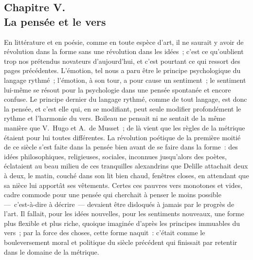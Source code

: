 \documentclass[french,twoside]{book} %
\begin{document}
\subsection[{Chapitre V. La pensée et le vers}]{Chapitre V. \\
La pensée et le vers}
\noindent  En littérature et en poésie, comme en toute espèce d’art, il ne saurait y avoir de révolution dans la forme sans une révolution dans les idées ; c’est ce qu’oublient trop nos prétendus novateurs d’aujourd’hui, et c’est pourtant ce qui ressort des pages précédentes. L’émotion, tel nous a paru être le principe psychologique du langage rythmé ; l’émotion, à son tour, a pour cause un sentiment ; le sentiment lui-même se résout pour la psychologie dans une pensée spontanée et encore confuse. Le principe dernier du langage rythmé, comme de tout langage, est donc la pensée, et c’est elle qui, en se modifiant, peut seule modifier profondément le rythme et l’harmonie du vers. Boileau ne pensait ni ne sentait de la même manière que V. Hugo et A. de Musset ; de là vient que les règles de la métrique étaient pour lui toutes différentes. La révolution poétique de la première moitié de ce siècle s’est faite dans la pensée bien avant de se faire dans la forme : des idées  philosophiques, religieuses, sociales, inconnues jusqu’alors des poètes, éclataient au beau milieu de ces tranquilles alexandrins que Delille attachait deux à deux, le matin, couché dans son lit bien chaud, fenêtres closes, en attendant que sa nièce lui apportât ses vêtements. Certes ces pauvres vers monotones et vides, cadre commode pour une pensée qui cherchait à penser le moins possible — c’est-à-dire à décrire — devaient être disloqués à jamais par le progrès de l’art. Il fallait, pour les idées nouvelles, pour les sentiments nouveaux, une forme plus flexible et plus riche, quoique imaginée d’après les principes immuables du vers ; par la force des choses, cette forme naquit : c’était comme le bouleversement moral et politique du siècle précédent qui finissait par retentir dans le domaine de la métrique.\par
\end{document}
